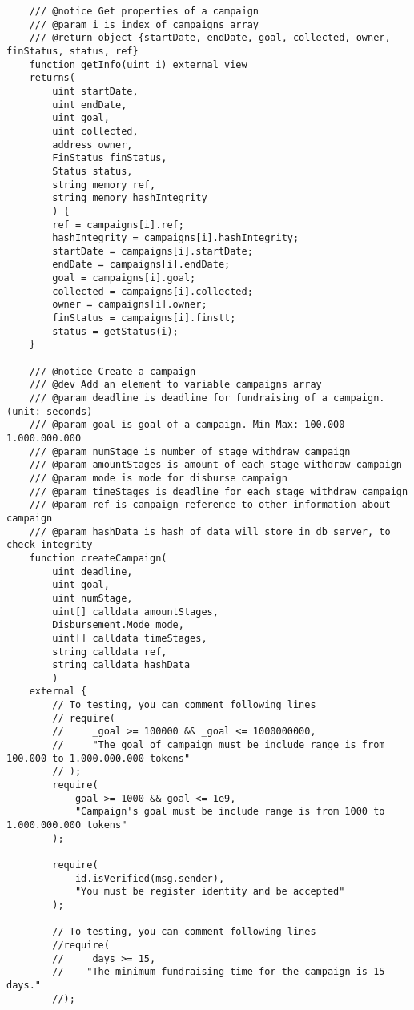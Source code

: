 \documentclass[../main-report.tex]{subfiles}
\begin{document}
\begin{lstlisting}
    /// @notice Get properties of a campaign
    /// @param i is index of campaigns array
    /// @return object {startDate, endDate, goal, collected, owner, finStatus, status, ref}
    function getInfo(uint i) external view
    returns(
        uint startDate,
        uint endDate,
        uint goal,
        uint collected,
        address owner,
        FinStatus finStatus,
        Status status,
        string memory ref,
        string memory hashIntegrity
        ) {
        ref = campaigns[i].ref;
        hashIntegrity = campaigns[i].hashIntegrity;
        startDate = campaigns[i].startDate;
        endDate = campaigns[i].endDate;
        goal = campaigns[i].goal;
        collected = campaigns[i].collected;
        owner = campaigns[i].owner;
        finStatus = campaigns[i].finstt;
        status = getStatus(i);
    }

    /// @notice Create a campaign
    /// @dev Add an element to variable campaigns array
    /// @param deadline is deadline for fundraising of a campaign. (unit: seconds)
    /// @param goal is goal of a campaign. Min-Max: 100.000-1.000.000.000
    /// @param numStage is number of stage withdraw campaign
    /// @param amountStages is amount of each stage withdraw campaign
    /// @param mode is mode for disburse campaign
    /// @param timeStages is deadline for each stage withdraw campaign
    /// @param ref is campaign reference to other information about campaign
    /// @param hashData is hash of data will store in db server, to check integrity
    function createCampaign(
        uint deadline,
        uint goal,
        uint numStage,
        uint[] calldata amountStages,
        Disbursement.Mode mode,
        uint[] calldata timeStages,
        string calldata ref,
        string calldata hashData
        )
    external {
        // To testing, you can comment following lines
        // require(
        //     _goal >= 100000 && _goal <= 1000000000,
        //     "The goal of campaign must be include range is from 100.000 to 1.000.000.000 tokens"
        // );
        require(
            goal >= 1000 && goal <= 1e9,
            "Campaign's goal must be include range is from 1000 to 1.000.000.000 tokens"
        );

        require(
            id.isVerified(msg.sender),
            "You must be register identity and be accepted"
        );

        // To testing, you can comment following lines
        //require(
        //    _days >= 15,
        //    "The minimum fundraising time for the campaign is 15 days."
        //);
        

\end{lstlisting}
\end{document}
